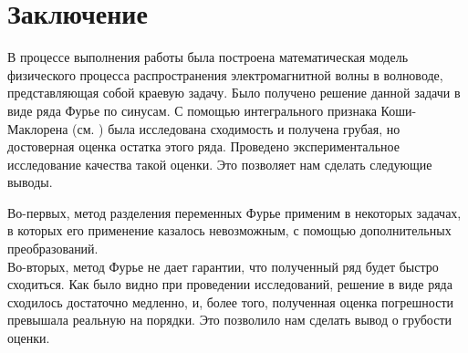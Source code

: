 \chapter*{Заключение}

В процессе выполнения работы была построена математическая модель физического процесса
распространения электромагнитной волны в волноводе, представляющая собой краевую задачу.
Было получено решение данной задачи в виде ряда Фурье по синусам. С помощью интегрального признака
Коши-Маклорена (см. \cite{sendov}) была исследована сходимость и получена грубая, но 
достоверная оценка остатка этого ряда. Проведено экспериментальное исследование качества такой оценки.
Это позволяет нам сделать следующие выводы.

Во-первых, метод разделения переменных Фурье применим в некоторых задачах, в которых его применение казалось
невозможным, с помощью дополнительных преобразований.\\
Во-вторых, метод Фурье не дает гарантии, что полученный ряд будет быстро сходиться. Как было видно при проведении
исследований, решение в виде ряда сходилось достаточно медленно, и, более того, полученная оценка погрешности
превышала реальную на порядки. Это позволило нам сделать вывод о грубости оценки.

